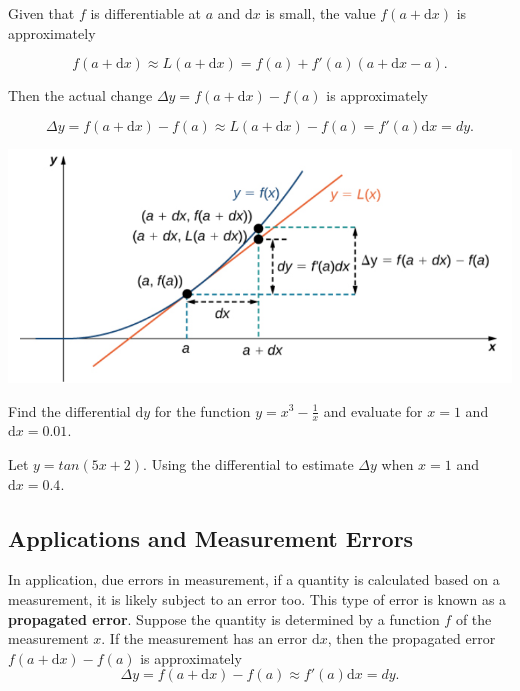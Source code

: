 Given that \(f\) is differentiable at \(a\) and \(\mathrm{d}x\) is
small, the value \(f(a+\mathrm{d}x)\) is approximately

\[
f(a+\mathrm{d}x)\approx L(a+\mathrm{d}x)=f(a)+f'(a)(a+\mathrm{d}x - a).
\]

Then the actual change \(\Delta y=f(a+\mathrm{d}x)-f(a)\) is
approximately

\[
\Delta y=f(a+\mathrm{d}x) - f(a)\approx L(a+\mathrm{d}x) - f(a)=f'(a)\mathrm{d}x=dy.
\]

\begin{fullwidth}
  \centering
  \includegraphics[scale=0.5]{img/image-20201017200202969.png}
\end{fullwidth}

\begin{example}

Find the differential \(\mathrm{d}y\) for the function \(y=x^3-\frac1x\)
and evaluate for \(x=1\) and \(\mathrm{d}x=0.01\).

\end{example}
\vspace*{6\baselineskip}

\begin{example}

Let \(y=tan(5x+2)\). Using the differential to estimate \(\Delta y\)
when \(x=1\) and \(\mathrm{d}x=0.4\).

\end{example}
\vspace*{6\baselineskip}

\hypertarget{applications-and-measurement-errors}{%
\subsection{Applications and Measurement
Errors}\label{applications-and-measurement-errors}}

In application, due errors in measurement, if a quantity is calculated
based on a measurement, it is likely subject to an error too. This type
of error is known as a \textbf{propagated error}. Suppose the quantity
is determined by a function \(f\) of the measurement \(x\). If the
measurement has an error \(\mathrm{d}x\), then the propagated error
\(f(a+\mathrm{d}x)-f(a)\) is approximately \[
\Delta y=f(a+\mathrm{d}x)-f(a)\approx f'(a)\mathrm{d}x=dy.
\]

